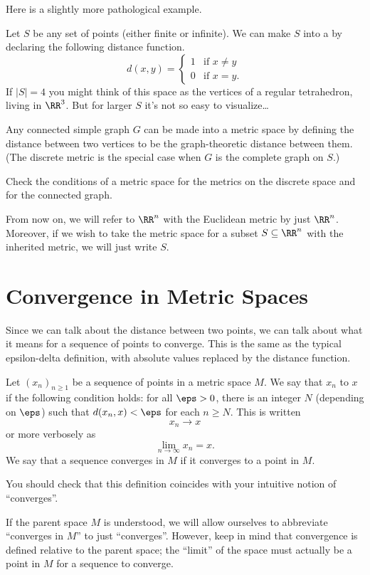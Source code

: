 Here is a slightly more pathological example.
\begin{example}
	Let $S$ be any set of points (either finite or infinite).
	We can make $S$ into a  by declaring the following distance function.
	\[
		d(x,y)
		=
		\begin{cases}
			1 & \text{if $x \neq y$} \\
			0 & \text{if $x = y$}.
		\end{cases}
	\]
	If $\left\lvert S \right\rvert = 4$ you might think of this space
	as the vertices of a regular tetrahedron, living in $\RR^3$.
	But for larger $S$ it's not so easy to visualize\dots
\end{example}
\begin{example}
	Any connected simple graph $G$ can be made into a metric space
	by defining the distance between two vertices to be the
	graph-theoretic distance between them.
	(The discrete metric is the special case when $G$ is the complete graph on $S$.)
\end{example}
\begin{ques}
	Check the conditions of a metric space for the metrics on the discrete space
	and for the connected graph.
\end{ques}

\begin{abuse}
	From now on, we will refer to $\RR^n$ with the Euclidean metric
	by just $\RR^n$.
	Moreover, if we wish to take the metric space for a subset $S \subseteq \RR^n$
	with the inherited metric, we will just write $S$.
\end{abuse}

\section{Convergence in Metric Spaces}

Since we can talk about the distance between two points, we can talk about what it means for a sequence of points to converge.
This is the same as the typical epsilon-delta definition, with absolute values replaced by the distance function.

\begin{definition}
	Let $(x_n)_{n \ge 1}$ be a sequence of points in a metric space $M$.
	We say that $x_n$  to $x$ if the following condition holds:
	for all $\eps > 0$, there is an integer $N$ (depending on $\eps$)
	such that $d(x_n, x) < \eps$ for each $n \ge N$.
	This is written \[ x_n \to x \] or more verbosely as \[ \lim_{n \to \infty} x_n = x. \]
	We say that a sequence converges in $M$ if it converges to a point in $M$.
\end{definition}
You should check that this definition coincides with your intuitive notion of ``converges''.
\begin{abuse}
	If the parent space $M$ is understood, we will allow ourselves
	to abbreviate ``converges in $M$'' to just ``converges''.
	However, keep in mind that convergence is defined relative to the parent space;
	the ``limit'' of the space must actually be a point in $M$ for a sequence to converge.
\end{abuse}

